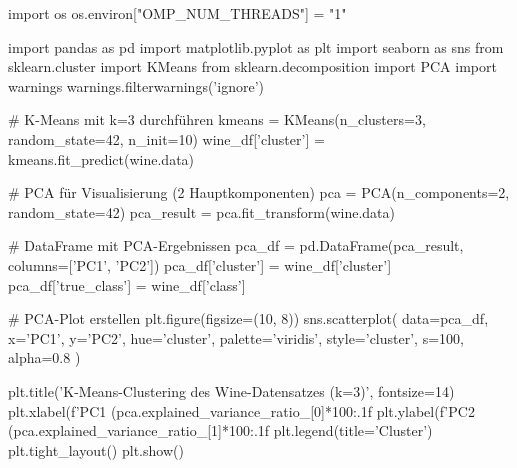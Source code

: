 import os
os.environ["OMP_NUM_THREADS"] = "1"

import pandas as pd
import matplotlib.pyplot as plt
import seaborn as sns
from sklearn.cluster import KMeans
from sklearn.decomposition import PCA
import warnings
warnings.filterwarnings('ignore')

# K-Means mit k=3 durchführen
kmeans = KMeans(n_clusters=3, random_state=42, n_init=10)
wine_df['cluster'] = kmeans.fit_predict(wine.data)

# PCA für Visualisierung (2 Hauptkomponenten)
pca = PCA(n_components=2, random_state=42)
pca_result = pca.fit_transform(wine.data)

# DataFrame mit PCA-Ergebnissen
pca_df = pd.DataFrame(pca_result, columns=['PC1', 'PC2'])
pca_df['cluster'] = wine_df['cluster']
pca_df['true_class'] = wine_df['class']

# PCA-Plot erstellen
plt.figure(figsize=(10, 8))
sns.scatterplot(
    data=pca_df,
    x='PC1', y='PC2',
    hue='cluster',
    palette='viridis',
    style='cluster',
    s=100,
    alpha=0.8
)

plt.title('K-Means-Clustering des Wine-Datensatzes (k=3)', fontsize=14)
plt.xlabel(f'PC1 ({pca.explained_variance_ratio_[0]*100:.1f}%
plt.ylabel(f'PC2 ({pca.explained_variance_ratio_[1]*100:.1f}%
plt.legend(title='Cluster')
plt.tight_layout()
plt.show()